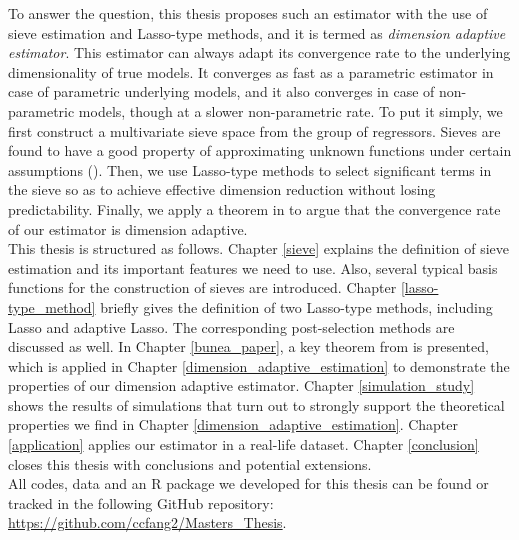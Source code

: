 \documentclass[12pt, a4paper]{article}
\theoremstyle{MAstyle} \newtheorem{assumption}{Assumption}[section]
\theoremstyle{MAstyle} \newtheorem{definition}{Definition}[section]
\theoremstyle{MAstyle} \newtheorem{theorem}{Theorem}[section]
\theoremstyle{MAstyle} \newtheorem{corollary}{Corollary}[section]
\begin{document}
        To answer the question, this thesis proposes such an estimator with the use of sieve estimation and Lasso-type methods, and it is termed as \textit{dimension adaptive estimator}. This estimator can always adapt its convergence rate to the underlying dimensionality of true models. It converges as fast as a parametric estimator in case of parametric underlying models, and it also converges in case of non-parametric models, though at a slower non-parametric rate. To put it simply, we first construct a multivariate sieve space from the group of regressors. Sieves are found to have a good property of approximating unknown functions under certain assumptions (\cite{Chen_2007}). Then, we use Lasso-type methods to select significant terms in the sieve so as to achieve effective dimension reduction without losing predictability. Finally, we apply a theorem in \cite{Bunea_2007} to argue that the convergence rate of our estimator is dimension adaptive.\\

        This thesis is structured as follows. Chapter \ref{sieve} explains the definition of sieve estimation and its important features we need to use. Also, several typical basis functions for the construction of sieves are introduced. Chapter \ref{lasso-type_method} briefly gives the definition of two Lasso-type methods, including Lasso and adaptive Lasso. The corresponding post-selection methods are discussed as well. In Chapter \ref{bunea_paper}, a key theorem from \cite{Bunea_2007} is presented, which is applied in Chapter \ref{dimension_adaptive_estimation} to demonstrate the properties of our dimension adaptive estimator. Chapter \ref{simulation_study} shows the results of simulations that turn out to strongly support the theoretical properties we find in Chapter \ref{dimension_adaptive_estimation}. Chapter \ref{application} applies our estimator in a real-life dataset. Chapter \ref{conclusion} closes this thesis with conclusions and potential extensions.\\

        All codes, data and an R package we developed for this thesis can be found or tracked in the following GitHub repository: \url{https://github.com/ccfang2/Masters_Thesis}.
 
	\newpage
\end{document}
